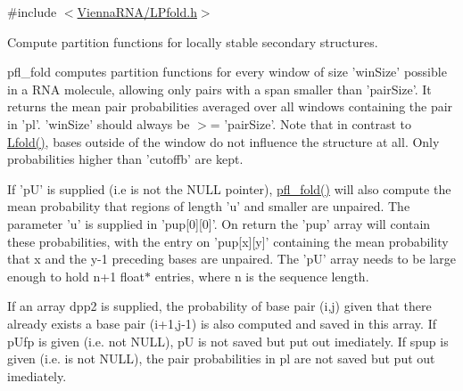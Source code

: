 {\ttfamily \#include $<$\hyperlink{LPfold_8h}{Vienna\-R\-N\-A/\-L\-Pfold.\-h}$>$}



Compute partition functions for locally stable secondary structures. 

pfl\-\_\-fold computes partition functions for every window of size 'win\-Size' possible in a R\-N\-A molecule, allowing only pairs with a span smaller than 'pair\-Size'. It returns the mean pair probabilities averaged over all windows containing the pair in 'pl'. 'win\-Size' should always be $>$= 'pair\-Size'. Note that in contrast to \hyperlink{group__local__mfe__fold_ga16e5a70e60835bb969eaecbe6482f1be}{Lfold()}, bases outside of the window do not influence the structure at all. Only probabilities higher than 'cutoffb' are kept.

If 'p\-U' is supplied (i.\-e is not the N\-U\-L\-L pointer), \hyperlink{group__local__pf__fold_ga7dcf599d07258801ea55e7d14a56908d}{pfl\-\_\-fold()} will also compute the mean probability that regions of length 'u' and smaller are unpaired. The parameter 'u' is supplied in 'pup\mbox{[}0\mbox{]}\mbox{[}0\mbox{]}'. On return the 'pup' array will contain these probabilities, with the entry on 'pup\mbox{[}x\mbox{]}\mbox{[}y\mbox{]}' containing the mean probability that x and the y-\/1 preceding bases are unpaired. The 'p\-U' array needs to be large enough to hold n+1 float$\ast$ entries, where n is the sequence length.

If an array dpp2 is supplied, the probability of base pair (i,j) given that there already exists a base pair (i+1,j-\/1) is also computed and saved in this array. If p\-Ufp is given (i.\-e. not N\-U\-L\-L), p\-U is not saved but put out imediately. If spup is given (i.\-e. is not N\-U\-L\-L), the pair probabilities in pl are not saved but put out imediately.


